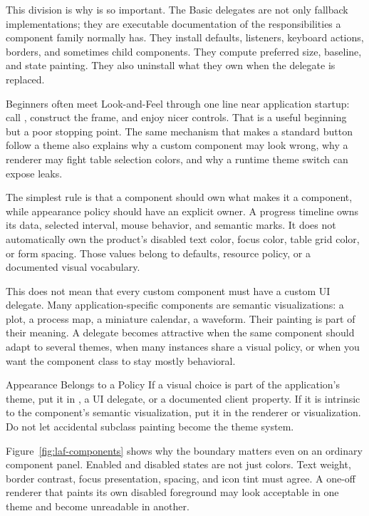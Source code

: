 This division is why  is so important. The Basic delegates are not only fallback implementations; they are executable documentation of the responsibilities a component family normally has. They install defaults, listeners, keyboard actions, borders, and sometimes child components. They compute preferred size, baseline, and state painting. They also uninstall what they own when the delegate is replaced.

Beginners often meet Look-and-Feel through one line near application startup: call , construct the frame, and enjoy nicer controls. That is a useful beginning but a poor stopping point. The same mechanism that makes a standard button follow a theme also explains why a custom component may look wrong, why a renderer may fight table selection colors, and why a runtime theme switch can expose leaks.

The simplest rule is that a component should own what makes it a component, while appearance policy should have an explicit owner. A progress timeline owns its data, selected interval, mouse behavior, and semantic marks. It does not automatically own the product's disabled text color, focus color, table grid color, or form spacing. Those values belong to defaults, resource policy, or a documented visual vocabulary.

This does not mean that every custom component must have a custom UI delegate. Many application-specific components are semantic visualizations: a plot, a process map, a miniature calendar, a waveform. Their painting is part of their meaning. A delegate becomes attractive when the same component should adapt to several themes, when many instances share a visual policy, or when you want the component class to stay mostly behavioral.

\begin{principlebox}{Appearance Belongs to a Policy}
If a visual choice is part of the application's theme, put it in , a UI delegate, or a documented client property. If it is intrinsic to the component's semantic visualization, put it in the renderer or visualization. Do not let accidental subclass painting become the theme system.
\end{principlebox}

Figure~\ref{fig:laf-components} shows why the boundary matters even on an ordinary component panel. Enabled and disabled states are not just colors. Text weight, border contrast, focus presentation, spacing, and icon tint must agree. A one-off renderer that paints its own disabled foreground may look acceptable in one theme and become unreadable in another.

